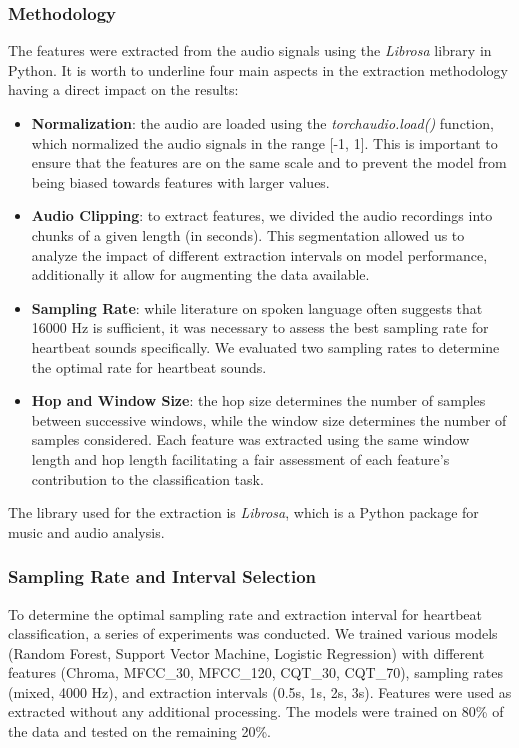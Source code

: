 \documentclass[twocolumn]{class}
\begin{document}
\subsubsection{Methodology}
The features were extracted from the audio signals using the \textit{Librosa} library in Python. It is worth to underline four main aspects in the extraction
methodology having a direct impact on the results:
\begin{itemize}[leftmargin=*]
    \item \textbf{Normalization}: the audio are loaded using the \textit{torchaudio.load()} function, which normalized the audio signals in the range [-1, 1]. This is important to ensure that the features are on the same scale and to prevent the model from being biased towards features with larger values.
    \item \textbf{Audio Clipping}: to extract features, we divided the audio recordings into chunks of a given length (in seconds). This segmentation allowed us to analyze the impact of different extraction intervals on model performance, additionally it allow for augmenting the data available. 
    \item \textbf{Sampling Rate}: while literature on spoken language often suggests that 16000 Hz is sufficient, it was necessary to assess the best sampling rate for heartbeat sounds specifically. We evaluated two sampling rates to determine the optimal rate for heartbeat sounds. 
    \item \textbf{Hop and Window Size}: the hop size determines the number of samples between successive windows, while the window size determines the number of samples considered. Each feature was extracted using the same window length and hop length facilitating a fair assessment of each feature's contribution to the classification task. 
\end{itemize}
The library used for the extraction is \textit{Librosa}, which is a Python package for music and audio analysis. 

\subsubsection{Sampling Rate and Interval Selection} \label{sec:sr_extraction_interval}
To determine the optimal sampling rate and extraction interval for heartbeat classification, a series of experiments was conducted.
We trained various models (Random Forest, Support Vector Machine, Logistic Regression) with different features (Chroma, MFCC\_30, MFCC\_120, CQT\_30, CQT\_70),
sampling rates (mixed, 4000 Hz), and extraction intervals (0.5s, 1s, 2s, 3s). Features were used as extracted without any additional processing. 
The models were trained on 80\% of the data and tested on the remaining 20\%.
\end{document}
